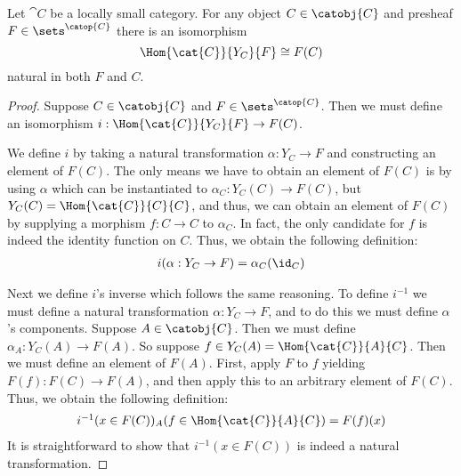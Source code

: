 \begin{lemma}[Yoneda]
  \label{lemma:yoneda}
  Let $\cat{C}$ be a locally small category.  For any object $C \in
  \catobj{C}$ and presheaf $F \in \sets^{\catop{C}}$ there is an isomorphism
  \[ \Hom{\cat{C}}{Y_C}{F} \cong F(C) \]
  natural in both $F$ and $C$.
\end{lemma}
\begin{proof}
  Suppose $C \in \catobj{C}$ and $F \in \sets^{\catop{C}}$.  Then we
  must define an isomorphism $i : \Hom{\cat{C}}{Y_C}{F} \to F(C)$.

  We define $i$ by taking a natural transformation $\alpha : Y_C \to
  F$ and constructing an element of $F(C)$.  The only means we have to
  obtain an element of $F(C)$ is by using $\alpha$ which can be
  instantiated to $\alpha_C : Y_C(C) \to F(C)$, but $Y_C(C) =
  \Hom{\cat{C}}{C}{C}$, and thus, we can obtain an element of $F(C)$ by
  supplying a morphism $f: C \to C$ to $\alpha_C$.  In fact, the only
  candidate for $f$ is indeed the identity function on $C$.  Thus, we
  obtain the following definition:
  \[
  \begin{array}{lll}
    i(\alpha : Y_C \to F) = \alpha_C(\id_C)\\
  \end{array}
  \]

  Next we define $i$'s inverse which follows the same reasoning.  To
  define $i^{-1}$ we must define a natural transformation $\alpha :
  Y_C \to F$, and to do this we must define $\alpha$'s components.
  Suppose $A \in \catobj{C}$.  Then we must define $\alpha_A : Y_C(A)
  \to F(A)$.  So suppose $f \in Y_C(A) = \Hom{\cat{C}}{A}{C}$.  Then we must
  define an element of $F(A)$.  First, apply $F$ to $f$ yielding $F(f)
  : F(C) \to F(A)$, and then apply this to an arbitrary element of
  $F(C)$.  Thus, we obtain the following definition:
  \[
  \begin{array}{lll}
    i^{-1}(x \in F(C))_A(f \in \Hom{\cat{C}}{A}{C}) = F(f)(x)\\
  \end{array}
  \]
  It is straightforward to show that $i^{-1}(x \in F(C))$ is indeed a
  natural transformation.


\end{proof}
